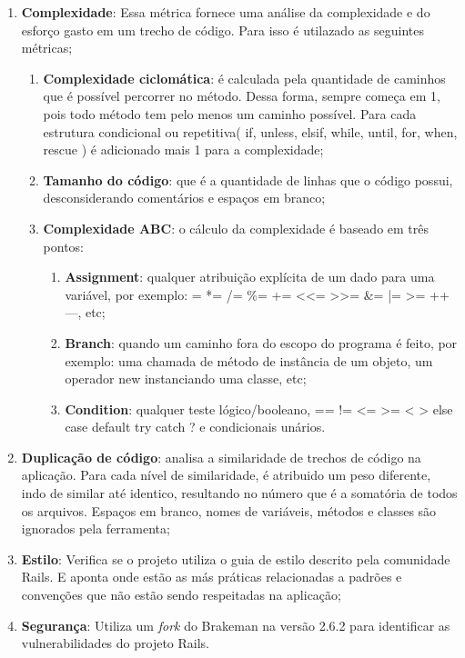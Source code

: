 \begin{enumerate}
	\item \textbf{Complexidade}: Essa métrica fornece uma análise da complexidade e do esforço gasto em um trecho de código. Para isso é utilazado as seguintes métricas;
	\begin{enumerate}
		\item \textbf{Complexidade ciclomática}: é calculada pela quantidade de caminhos que é possível percorrer no método. Dessa forma, sempre começa em 1, pois todo método tem pelo menos um caminho possível. Para cada estrutura condicional ou repetitiva( if, unless, elsif, while, until, for, when, rescue ) é adicionado mais 1 para a complexidade;
		\item \textbf{Tamanho do código}: que é a quantidade de linhas que o código possui, desconsiderando comentários e espaços em branco;
		\item \textbf{Complexidade ABC}: o cálculo da complexidade é baseado em três pontos:
		\begin{enumerate}
			\item \textbf{Assignment}: qualquer atribuição explícita de um dado para uma variável, por exemplo: = *= /= \%= += <<= >>= \&= |= >= ++ —, etc;
		    \item \textbf{Branch}: quando um caminho fora do escopo do programa é feito, por exemplo: uma chamada de método de instância de um objeto, um operador new instanciando uma classe, etc;
    		\item \textbf{Condition}: qualquer teste lógico/booleano, == != <= >= < > else case default try catch ? e condicionais unários.
		\end{enumerate}
	\end{enumerate}
	\item \textbf{Duplicação de código}: analisa a similaridade de trechos de código na aplicação. Para cada nível de similaridade, é atribuido um peso diferente, indo de similar até identico, resultando no número que é a somatória de todos os arquivos. Espaços em branco, nomes de variáveis, métodos e classes são ignorados pela ferramenta;
	\item \textbf{Estilo}: Verifica se o projeto utiliza o guia de estilo descrito pela comunidade Rails. E aponta onde estão as más práticas relacionadas a padrões e convenções que não estão sendo respeitadas na aplicação;
	\item \textbf{Segurança}: Utiliza um \textit{fork} do Brakeman na versão 2.6.2 para identificar as vulnerabilidades do projeto Rails.
\end{enumerate}

